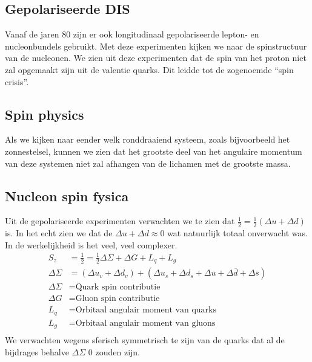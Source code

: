 \documentclass[../main.tex]{subfiles}
\begin{document}
\subsection{Gepolariseerde DIS}%
\label{sub:gepolariseerde_dis}

Vanaf de jaren 80 zijn er ook longitudinaal gepolariseerde lepton- en nucleonbundels gebruikt. Met deze experimenten kijken we naar de spinstructuur van de nucleonen. We zien uit deze experimenten dat de spin van het proton niet zal opgemaakt zijn uit de valentie quarks. Dit leidde tot de zogenoemde ``spin crisis''.

\subsection{Spin physics}%
\label{sub:spin_physics}

Als we kijken naar eender welk ronddraaiend systeem, zoals bijvoorbeeld het zonnestelsel, kunnen we zien dat het grootste deel van het angulaire momentum van deze systemen niet zal afhangen van de lichamen met de grootste massa.

\subsection{Nucleon spin fysica}%
\label{sub:nucleon_spin_fysica}

Uit de gepolariseerde experimenten verwachten we te zien dat $\frac{1}{2} = \frac{1}{2} (\Delta u + \Delta d)$ is. In het echt zien we dat de $\Delta u + \Delta d \approx 0$ wat natuurlijk totaal onverwacht was.\\
In de werkelijkheid is het veel, veel complexer.
\begin{equation}
    \begin{aligned}
        \label{eq:spin_werkelijk}
        S_z &= \frac{1}{2} = \frac{1}{2} \Delta \Sigma + \Delta G + L_q + L_g\\
        \Delta \Sigma &= (\Delta u_v + \Delta d_v) + (\Delta u_s + \Delta d_s + \Delta \overline u+ \Delta \overline d+ \Delta \overline s)\\
        \Delta \Sigma &= \text{Quark spin contributie}\\
        \Delta G &= \text{Gluon spin contributie}\\
        L_q &= \text{Orbitaal angulair moment van quarks}\\
        L_g &= \text{Orbitaal angulair moment van gluons}\\
    \end{aligned}
\end{equation}
We verwachten wegens sferisch symmetrisch te zijn van de quarks dat al de bijdrages behalve $\Delta \Sigma$ 0 zouden zijn.\\
\end{document}
